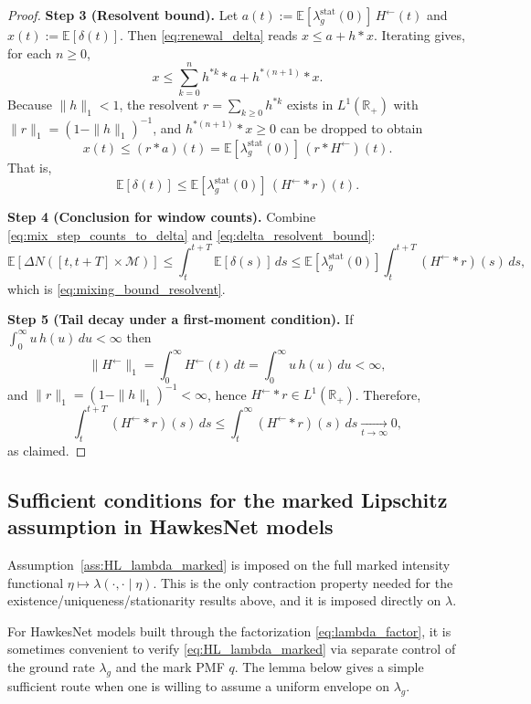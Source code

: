 \documentclass[12pt]{article}
\begin{document}
\begin{proof}
\textbf{Step 3 (Resolvent bound).}
Let $a(t):=\mathbb E[\lambda_g^{\mathrm{stat}}(0)]\,H^\leftarrow(t)$ and $x(t):=\mathbb E[\delta(t)]$.
Then \eqref{eq:renewal_delta} reads $x\le a + h*x$.
Iterating gives, for each $n\ge 0$,
\[
x \le \sum_{k=0}^n h^{*k} * a + h^{*(n+1)}*x.
\]
Because $\|h\|_1<1$, the resolvent $r=\sum_{k\ge 0} h^{*k}$ exists in $L^1(\mathbb R_+)$ with $\|r\|_1=(1-\|h\|_1)^{-1}$,
and $h^{*(n+1)}*x\ge 0$ can be dropped to obtain
\[
x(t)\le (r*a)(t)=\mathbb E[\lambda_g^{\mathrm{stat}}(0)]\, (r*H^\leftarrow)(t).
\]
That is,
\begin{equation}
\label{eq:delta_resolvent_bound}
\mathbb E[\delta(t)]
\le
\mathbb E[\lambda_g^{\mathrm{stat}}(0)]\,(H^\leftarrow * r)(t).
\end{equation}

\textbf{Step 4 (Conclusion for window counts).}
Combine \eqref{eq:mix_step_counts_to_delta} and \eqref{eq:delta_resolvent_bound}:
\[
\mathbb E[\Delta N([t,t+T]\times\mathcal M)]
\le
\int_t^{t+T}\mathbb E[\delta(s)]\,ds
\le
\mathbb E[\lambda_g^{\mathrm{stat}}(0)]\int_t^{t+T}(H^\leftarrow*r)(s)\,ds,
\]
which is \eqref{eq:mixing_bound_resolvent}.

\textbf{Step 5 (Tail decay under a first-moment condition).}
If $\int_0^\infty u\,h(u)\,du<\infty$ then
\[
\|H^\leftarrow\|_1=\int_0^\infty H^\leftarrow(t)\,dt=\int_0^\infty u\,h(u)\,du<\infty,
\]
and $\|r\|_1=(1-\|h\|_1)^{-1}<\infty$, hence $H^\leftarrow*r\in L^1(\mathbb R_+)$.
Therefore,
\[
\int_t^{t+T}(H^\leftarrow*r)(s)\,ds \le \int_t^\infty (H^\leftarrow*r)(s)\,ds \xrightarrow[t\to\infty]{} 0,
\]
as claimed.
\end{proof}

\subsection{Sufficient conditions for the marked Lipschitz assumption in HawkesNet models}
\label{sec:sufficient_conditions_HL}

Assumption~\ref{ass:HL_lambda_marked} is imposed on the full marked intensity functional $\eta\mapsto \lambda(\cdot,\cdot\mid \eta)$.
This is the only contraction property needed for the existence/uniqueness/stationarity results above, and it is imposed directly on $\lambda$.

For HawkesNet models built through the factorization \eqref{eq:lambda_factor}, it is sometimes convenient to verify
\eqref{eq:HL_lambda_marked} via separate control of the ground rate $\lambda_g$ and the mark PMF $q$.
The lemma below gives a simple sufficient route when one is willing to assume a uniform envelope on $\lambda_g$.
\end{document}
